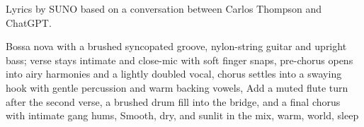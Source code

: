 
\begin{notes}
Lyrics by SUNO based on a conversation between Carlos Thompson and ChatGPT.
\end{notes}
\begin{style}
Bossa nova with a brushed syncopated groove, nylon-string guitar and upright bass; verse stays intimate and close-mic with soft finger snaps, pre-chorus opens into airy harmonies and a lightly doubled vocal, chorus settles into a swaying hook with gentle percussion and warm backing vowels, Add a muted flute turn after the second verse, a brushed drum fill into the bridge, and a final chorus with intimate gang hums, Smooth, dry, and sunlit in the mix, warm, world, sleep
\end{style}
